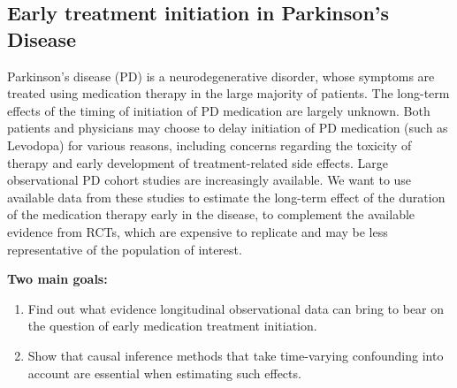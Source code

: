 \documentclass[a0,portrait]{a0poster}\usepackage[]{graphicx}\usepackage[svgnames]{xcolor}
\begin{document}
\begin{multicols}{2} %


\color{SaddleBrown} %
\large

\color{DarkSlateGray}
\section*{Early treatment initiation in Parkinson's Disease}

Parkinson's disease (PD) is a neurodegenerative disorder, whose symptoms are treated using medication therapy in the large majority of patients. The long-term effects of the timing of initiation of PD medication are largely unknown. Both patients and physicians may choose to delay initiation of PD medication (such as Levodopa) for various reasons, including concerns regarding the toxicity of therapy and early development of treatment-related side effects. Large observational PD cohort studies are increasingly available. We want to use available data from these studies to estimate the long-term effect of the duration of the medication therapy early in the disease, to complement the available evidence from RCTs, which are expensive to replicate and may be less representative of the population of interest.
\vspace{1cm}
\begin{tcolorbox}[colback=yellow!25!white,colframe=yellow!25!white,boxsep=0.75cm]
\textbf{Two main goals:}
\begin{enumerate}
\item Find out what evidence longitudinal observational data can bring to bear on the question of early medication treatment initiation.
\item Show that causal inference methods that take time-varying confounding into account are essential when estimating such effects.
\end{enumerate}
\end{tcolorbox}

\color{DarkSlateGray} 

\end{multicols}
\end{document}
